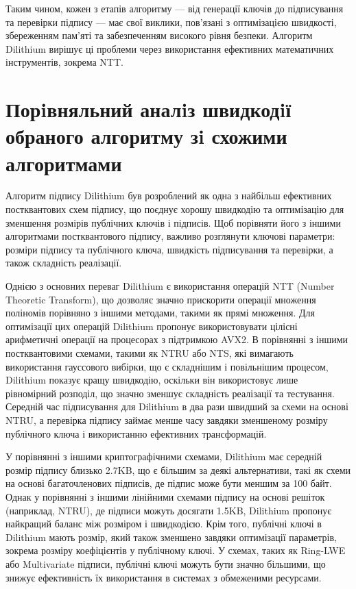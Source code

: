 \documentclass[12pt]{HomusWorkus}
\begin{document}
Таким чином, кожен з етапів алгоритму — від генерації ключів до підписування та перевірки підпису — має свої виклики, пов'язані з оптимізацією швидкості, збереженням пам'яті та забезпеченням високого рівня безпеки. Алгоритм Dilithium вирішує ці проблеми через використання ефективних математичних інструментів, зокрема NTT.

\section{Порiвняльний аналiз швидкодiї обраного алгоритму зi схожими алгоритмами}

Алгоритм підпису Dilithium був розроблений як одна з найбільш ефективних постквантових схем підпису, що поєднує хорошу швидкодію та оптимізацію для зменшення розмірів публічних ключів і підписів. Щоб порівняти його з іншими алгоритмами постквантового підпису, важливо розглянути ключові параметри: розміри підпису та публічного ключа, швидкість підписування та перевірки, а також складність реалізації.

Однією з основних переваг Dilithium є використання операцій NTT (Number Theoretic Transform), що дозволяє значно прискорити операції множення поліномів порівняно з іншими методами, такими як прямі множення. Для оптимізації цих операцій Dilithium пропонує використовувати цілісні арифметичні операції на процесорах з підтримкою AVX2. В порівнянні з іншими постквантовими схемами, такими як NTRU або NTS, які вимагають використання гауссового вибірки, що є складнішим і повільнішим процесом, Dilithium показує кращу швидкодію, оскільки він використовує лише рівномірний розподіл, що значно зменшує складність реалізації та тестування. Середній час підписування для Dilithium в два рази швидший за схеми на основі NTRU, а перевірка підпису займає менше часу завдяки зменшеному розміру публічного ключа і використанню ефективних трансформацій.

У порівнянні з іншими криптографічними схемами, Dilithium має середній розмір підпису близько 2.7KB, що є більшим за деякі альтернативи, такі як схеми на основі багаточленових підписів, де підпис може бути меншим за 100 байт. Однак у порівнянні з іншими лінійними схемами підпису на основі решіток (наприклад, NTRU), де підписи можуть досягати 1.5KB, Dilithium пропонує найкращий баланс між розміром і швидкодією. Крім того, публічні ключі в Dilithium мають розмір, який також зменшено завдяки оптимізації параметрів, зокрема розміру коефіцієнтів у публічному ключі. У схемах, таких як Ring-LWE або Multivariate підписи, публічні ключі можуть бути значно більшими, що знижує ефективність їх використання в системах з обмеженими ресурсами.
\end{document}
